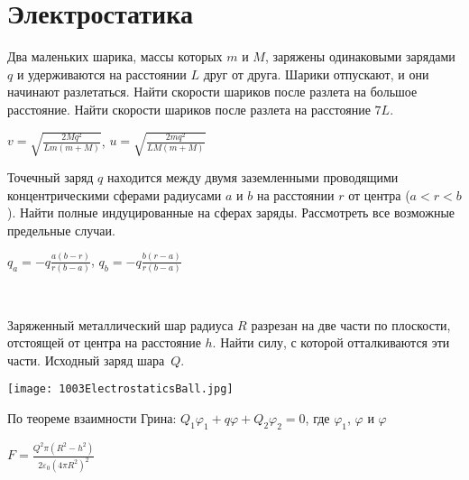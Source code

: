\section{Электростатика}

\begin{ex}
Два маленьких шарика, массы которых $m$ и $M$, заряжены одинаковыми зарядами $q$ и удерживаются на расстоянии $L$ друг от друга. Шарики отпускают, и они начинают разлетаться. Найти скорости шариков после разлета на большое расстояние. Найти скорости шариков после разлета на расстояние $7L$.

\begin{ans}
$v = \sqrt{\frac{2Mq^2}{Lm(m+M)}}$, $u = \sqrt{\frac{2mq^2}{LM(m+M)}}$
\end{ans}
\end{ex}

\begin{ex}
Точечный заряд $q$ находится между двумя заземленными проводящими концентрическими сферами 
радиусами $a$ и $b$ на расстоянии $r$ от центра ($a<r<b$). 
Найти полные индуцированные на сферах заряды. Рассмотреть все возможные предельные случаи.

\begin{ans}
$q_a = -q\frac{a(b-r)}{r(b-a)}$, $q_b = -q\frac{b(r-a)}{r(b-a)}$
\end{ans}
\end{ex}

\begin{ex}
\hspace{0pt} \\
\begin{minipage}{.65\textwidth}
Заряженный металлический шар радиуса $R$ разрезан на две части по плоскости, отстоящей от центра на расстояние $h$. 
Найти силу, с которой отталкиваются эти части. Исходный заряд шара~$Q$.
\end{minipage}
\begin{minipage}{.35\textwidth}
\centering
\texttt{[image: 1003ElectrostaticsBall.jpg]}
\end{minipage}
\begin{sol}
По теореме взаимности Грина: $Q_1\varphi_1+q\varphi+Q_2\varphi_2=0$, где $\varphi_1$, $\varphi$ и $\varphi$
\end{sol}
\begin{ans}
$F = \frac{Q^2 \pi (R^2-h^2)}{2 \varepsilon_0 {(4 \pi R^2)}^2}$
\end{ans}
\end{ex}

